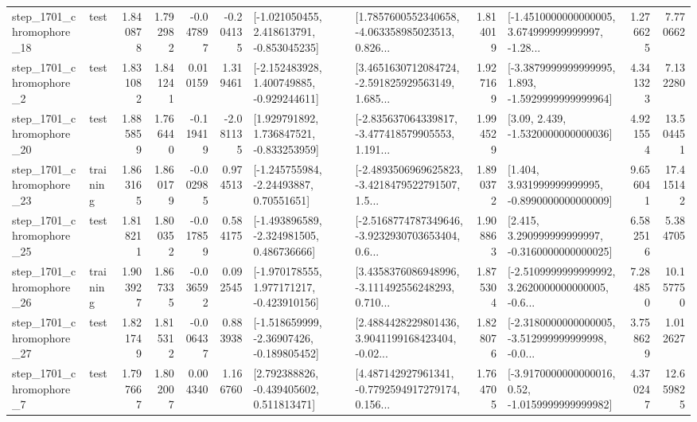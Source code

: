 \begin{tabular}{llrrrrllrlrr}
 step\_1701\_chromophore\_18 &      test &      1.840878 &    1.792982 &     -0.047897 & -0.204135 &   [-1.021050455, 2.418613791, -0.853045235] &  [1.7857600552340658, -4.063358985023513, 0.826... &       1.814019 &  [-1.4510000000000005, 3.674999999999997, -1.28... &            1.276625 &          7.770662 \\
  step\_1701\_chromophore\_2 &      test &      1.831082 &    1.841241 &      0.010159 &  1.319461 &   [-2.152483928, 1.400749885, -0.929244611] &  [3.4651630712084724, -2.591825929563149, 1.685... &       1.927169 &  [-3.3879999999999995, 1.893, -1.5929999999999964] &            4.341323 &          7.132280 \\
 step\_1701\_chromophore\_20 &      test &      1.885859 &    1.766440 &     -0.119419 & -2.081135 &    [1.929791892, 1.736847521, -0.833253959] &  [-2.835637064339817, -3.477418579905553, 1.191... &       1.994529 &                 [3.09, 2.439, -1.5320000000000036] &            4.921554 &         13.504451 \\
 step\_1701\_chromophore\_23 &  training &      1.863165 &    1.860179 &     -0.002985 &  0.974513 &     [-1.245755984, -2.24493887, 0.70551651] &  [-2.4893506969625823, -3.4218479522791507, 1.5... &       1.890372 &    [1.404, 3.931999999999995, -0.8990000000000009] &            9.656041 &         17.415142 \\
 step\_1701\_chromophore\_25 &      test &      1.818211 &    1.800352 &     -0.017859 &  0.584175 &   [-1.493896589, -2.324981505, 0.486736666] &  [-2.5168774787349646, -3.9232930703653404, 0.6... &       1.908863 &    [2.415, 3.290999999999997, -0.3160000000000025] &            6.582516 &          5.384705 \\
 step\_1701\_chromophore\_26 &  training &      1.903927 &    1.867335 &     -0.036592 &  0.092545 &   [-1.970178555, 1.977171217, -0.423910156] &  [3.4358376086948996, -3.111492556248293, 0.710... &       1.875304 &  [-2.5109999999999992, 3.2620000000000005, -0.6... &            7.284850 &         10.157750 \\
 step\_1701\_chromophore\_27 &      test &      1.821749 &    1.815312 &     -0.006437 &  0.883938 &   [-1.518659999, -2.36907426, -0.189805452] &  [2.4884428229801436, 3.9041199168423404, -0.02... &       1.828076 &  [-2.3180000000000005, -3.512999999999998, -0.0... &            3.758629 &          1.012627 \\
  step\_1701\_chromophore\_7 &      test &      1.797667 &    1.802007 &      0.004340 &  1.166760 &    [2.792388826, -0.439405602, 0.511813471] &  [4.487142927961341, -0.7792594917279174, 0.156... &       1.764705 &   [-3.9170000000000016, 0.52, -1.0159999999999982] &            4.370247 &         12.659825 \\

\end{tabular}

